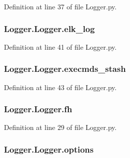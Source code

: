 Definition at line 37 of file Logger.\-py.

\hypertarget{class_logger_1_1_logger_a0de302776caf63f84bb88e198dcd8b37}{
\subsubsection[{elk\-\_\-log}]{\setlength{\rightskip}{0pt plus 5cm}Logger.\-Logger.\-elk\-\_\-log}}\label{class_logger_1_1_logger_a0de302776caf63f84bb88e198dcd8b37}


Definition at line 41 of file Logger.\-py.

\hypertarget{class_logger_1_1_logger_aa435d45f90a7c7b6595bbb5c14f9049d}{
\subsubsection[{execmds\-\_\-stash}]{\setlength{\rightskip}{0pt plus 5cm}Logger.\-Logger.\-execmds\-\_\-stash}}\label{class_logger_1_1_logger_aa435d45f90a7c7b6595bbb5c14f9049d}


Definition at line 43 of file Logger.\-py.

\hypertarget{class_logger_1_1_logger_a68875fbff44820c122a69fee38bad238}{
\subsubsection[{fh}]{\setlength{\rightskip}{0pt plus 5cm}Logger.\-Logger.\-fh}}\label{class_logger_1_1_logger_a68875fbff44820c122a69fee38bad238}


Definition at line 29 of file Logger.\-py.

\hypertarget{class_logger_1_1_logger_a8e881dc46a69491fab52e8fca3d8dd59}{
\subsubsection[{options}]{\setlength{\rightskip}{0pt plus 5cm}Logger.\-Logger.\-options}}\label{class_logger_1_1_logger_a8e881dc46a69491fab52e8fca3d8dd59}


